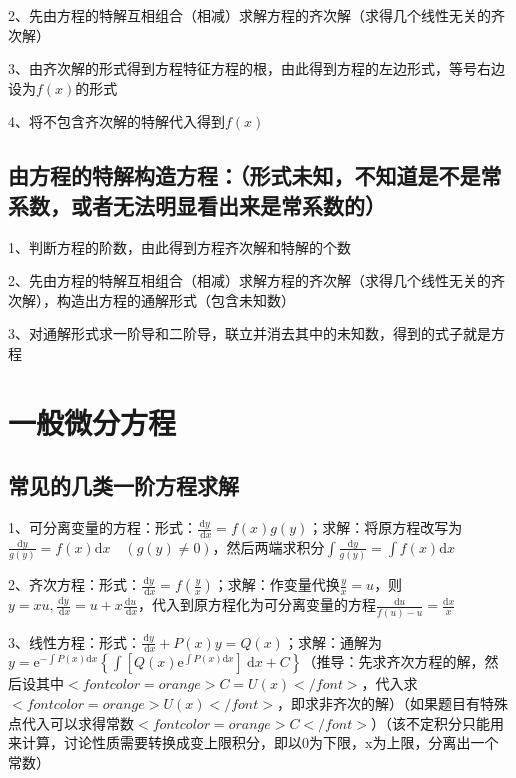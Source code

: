 2、先由方程的特解互相组合（相减）求解方程的齐次解（求得几个线性无关的齐次解）

3、由齐次解的形式得到方程特征方程的根，由此得到方程的左边形式，等号右边设为$ f(x) $的形式

4、将不包含齐次解的特解代入得到$ f(x) $



\subsection{由方程的特解构造方程：（形式未知，不知道是不是常系数，或者无法明显看出来是常系数的）}

1、判断方程的阶数，由此得到方程齐次解和特解的个数

2、先由方程的特解互相组合（相减）求解方程的齐次解（求得几个线性无关的齐次解），构造出方程的通解形式（包含未知数）

3、对通解形式求一阶导和二阶导，联立并消去其中的未知数，得到的式子就是方程

\section{一般微分方程}



\subsection{常见的几类一阶方程求解}

1、可分离变量的方程：形式：$ \frac{\mathrm{d} y}{\mathrm{~d} x}=f(x) g(y) $；求解：将原方程改写为$ \frac{\mathrm{d} y}{g(y)}=f(x) \mathrm{d} x \quad(g(y) \neq 0) $，然后两端求积分$ \int \frac{\mathrm{d} y}{g(y)}=\int f(x) \mathrm{d} x $

2、齐次方程：形式：$ \frac{\mathrm{d} y}{\mathrm{~d} x}=f\left(\frac{y}{x}\right) $；求解：作变量代换$ \frac{y}{x}=u $，则$ y=x u, \frac{\mathrm{d} y}{\mathrm{~d} x}=u+x \frac{\mathrm{d} u}{\mathrm{~d} x} $，代入到原方程化为可分离变量的方程$ \frac{\mathrm{d} u}{f(u)-u}=\frac{\mathrm{d} x}{x} $

3、线性方程：形式：$ \frac{\mathrm{d} y}{\mathrm{~d} x}+P(x) y=Q(x) $；求解：通解为$ y=\mathrm{e}^{-\int P(x) \mathrm{d} x}\left\{\int \left[Q(x) \mathrm{e}^{\int P(x) \mathrm{d} x} \right]\mathrm{~d} x+C\right\} $（推导：先求齐次方程的解，然后设其中$ <font color=orange>C=U(x)</font> $，代入求$ <font color=orange>U(x)</font> $，即求非齐次的解）（如果题目有特殊点代入可以求得常数$ <font color=orange>C</font> $）（该不定积分只能用来计算，讨论性质需要转换成变上限积分，即以0为下限，x为上限，分离出一个常数）

